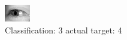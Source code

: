 \begin{figure}[h!]
\begin{center}
\includegraphics[width=0.60\columnwidth]{figures/ID3188_class_3_target_4.png}
\end{center}
\caption{ Classification: 3 actual target: 4}
\label{fig:ID3188_class_3_target_4}
\end{figure}

